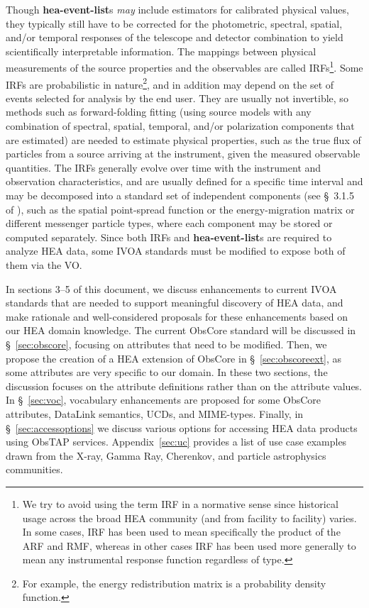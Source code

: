 \documentclass[11pt,a4paper]{ivoa}
\begin{document}
Though {\bf hea-event-list}s {\em may\/} include estimators for calibrated physical values, they typically still have to be corrected for the photometric, spectral, spatial, and/or temporal responses of the telescope and detector combination to yield scientifically interpretable information. The mappings between physical measurements of the source properties and the observables are called \glspl{IRF}\footnote{We try to avoid using the term \gls{IRF} in a normative sense since historical usage across the broad \gls{HEA} community (and from facility to facility) varies. In some cases, \gls{IRF} has been used to mean specifically the product of the \gls{ARF} and \gls{RMF}, whereas in other cases \gls{IRF} has been used more generally to mean any instrumental response function regardless of type.}.  Some \glspl{IRF} are probabilistic in nature\footnote{For example, the energy redistribution matrix is a probability density function.}, and in addition may depend on the set of events selected for analysis by the end user.  They are usually not invertible, so methods such as forward-folding fitting (using source models with any combination of spectral, spatial, temporal, and/or polarization components that are estimated) are needed to estimate physical properties, such as the true flux of particles from a source arriving at the instrument, given the measured observable quantities. The \glspl{IRF} generally evolve over time with the instrument and observation characteristics, and are usually defined for a specific time interval and may be decomposed into a standard set of independent components (see \S~3.1.5 of \citealt{2024ivoa.note.heig}), such as the spatial point-spread function or the energy-migration matrix or different messenger particle types, where each component may be stored or computed separately.  Since both \glspl{IRF} and {\bf hea-event-list}s are required to analyze \gls{HEA} data, some \gls{IVOA} standards must be modified to expose both of them via the \gls{VO}.

In sections 3--5 of this document, we discuss enhancements to current \gls{IVOA} standards that are needed to support meaningful discovery of \gls{HEA} data, and make rationale and well-considered proposals for these enhancements based on our \gls {HEA} domain knowledge.  The current ObsCore standard will be discussed in \S~\ref{sec:obscore}, focusing on attributes that need to be modified. Then, we propose the creation of a \gls{HEA} extension of ObsCore in \S~\ref{sec:obscoreext}, as some attributes are very specific to our domain. In these two sections, the discussion focuses on the attribute definitions rather than on the attribute values. In \S~\ref{sec:voc}, vocabulary enhancements are proposed for some ObsCore attributes, DataLink semantics, UCDs, and MIME-types. Finally, in \S~\ref{sec:accessoptions} we discuss various options for accessing \gls{HEA} data products using ObsTAP services. Appendix~\ref{sec:uc} provides a list of use case examples drawn from the X-ray, Gamma Ray, Cherenkov, and particle astrophysics communities. 
\end{document}
